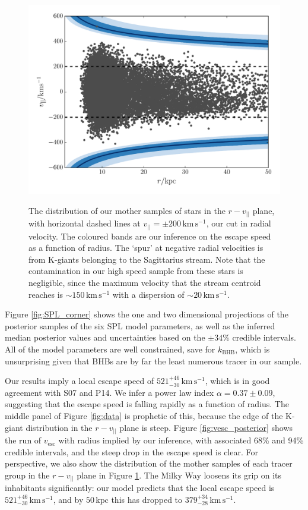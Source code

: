\documentclass[useAMS,twocolumn,usenatbib]{mn2e}
\def\kpc{{\,\mathrm{kpc}}}
\def\kms{{\,\mathrm{km\,s^{-1}}}}
\def\vlos{{v_{||}}}
\def\vesc{{v_\mathrm{esc}}}
\begin{document}
\begin{figure}
\includegraphics[width=\columnwidth]{plots/stars_bound}\\
\caption{The distribution of our mother samples of stars in the $r-\vlos$ plane, with horizontal dashed lines at $\vlos = \pm 200\kms$, our cut in radial velocity. 
The coloured bands are our inference on the escape speed as a function of radius.
The `spur' at negative radial velocities is from K-giants belonging to the Sagittarius stream. 
Note that the contamination in our high speed sample from these stars is negligible, since the maximum velocity that the stream centroid reaches is $\sim 150\kms$ \citep{Be14} with a dispersion of $\sim 20\kms$.}
\label{fig:stars_bound}
\end{figure}

Figure \ref{fig:SPL_corner} shows the one and two dimensional projections of the posterior samples of the six SPL model parameters, as well as the inferred median posterior values and uncertainties based on the $\pm 34\%$ credible intervals. 
All of the model parameters are well constrained, save for $k_\mathrm{BHB}$, which is unsurprising given that BHBs are by far the least numerous tracer in our sample.

Our results imply a local escape speed of $521^{+46}_{-30}\kms$, which is in good agreement with S07 and P14.  
We infer a power law index $\alpha = 0.37\pm0.09$, suggesting that the escape speed is falling rapidly as a function of radius.
The middle panel of Figure \ref{fig:data} is prophetic of this, because the edge of the K-giant distribution in the $r-\vlos$ plane is steep.
Figure \ref{fig:vesc_posterior} shows the run of $\vesc$ with radius implied by our inference, with associated 68\% and 94\% credible intervals, and the steep drop in the escape speed is clear.
For perspective, we also show the distribution of the mother samples of each tracer group in the $r-\vlos$ plane in Figure \ref{fig:stars_bound}.
The Milky Way loosens its grip on its inhabitants significantly: our model predicts that the local escape speed is $521^{+46}_{-30}\kms$, and by $50\kpc$ this has dropped to $379^{+34}_{-28}\kms$.
\end{document}
